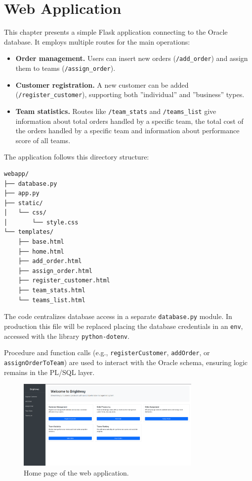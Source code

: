 \chapter{Web Application}

This chapter presents a simple Flask application connecting to the Oracle database. 
It employs multiple routes for the main operations:

\begin{itemize}
    \item \textbf{Order management.} Users can insert new orders (\texttt{/add\_order}) 
    and assign them to teams (\texttt{/assign\_order}).
    \item \textbf{Customer registration.} A new customer can be added (\texttt{/register\_customer}), 
    supporting both ''individual'' and ''business'' types.
    \item \textbf{Team statistics.} Routes like \texttt{/team\_stats} and \texttt{/teams\_list} 
    give information about total orders handled by a specific team, the total cost of the orders handled by a specific team and information about performance score of all teams.
\end{itemize}

The application follows this directory structure:
\begin{verbatim}
webapp/
├── database.py
├── app.py
├── static/        
│   └── css/
│       └── style.css
└── templates/      
    ├── base.html
    ├── home.html
    ├── add_order.html
    ├── assign_order.html
    ├── register_customer.html
    ├── team_stats.html
    └── teams_list.html
\end{verbatim}

The code centralizes database access in a separate \texttt{database.py} module. In production this file will be replaced placing the database credentials in an \texttt{env}, accessed with the library \texttt{python-dotenv}. 

Procedure and function calls (e.g., \texttt{registerCustomer}, \texttt{addOrder}, or \texttt{assignOrderToTeam}) are used to interact with the Oracle schema, ensuring logic remains in the PL/SQL layer.

\begin{figure}[H]
    \centering
    \includegraphics[width=0.8\textwidth]{img/web_app/home.png}
    \caption{Home page of the web application.}
\end{figure}

